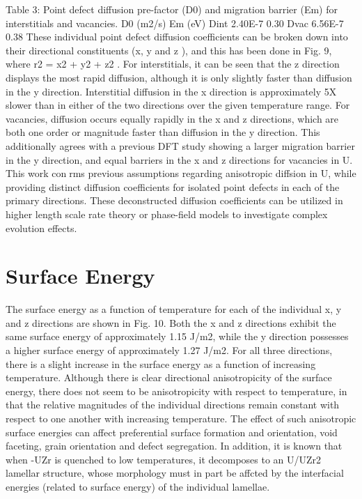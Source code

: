 \documentclass[review]{elsarticle}
\begin{document}
Table 3: Point defect diffusion pre-factor (D0) and migration barrier (Em) for interstitials and vacancies.
D0 (m2/s) Em (eV)
Dint 2.40E-7 0.30
Dvac 6.56E-7 0.38
These individual point defect diffusion coefficients can be broken down into their directional constituents
(x, y and z ), and this has been done in Fig. 9, where r2 = x2 + y2 + z2 . For interstitials, it can be seen
that the z direction displays the most rapid diffusion, although it is only slightly faster than diffusion in
the y direction. Interstitial diffusion in the x direction is approximately 5X slower than in either of the two
directions over the given temperature range. For vacancies, diffusion occurs equally rapidly in the x and z
directions, which are both one order or magnitude faster than diffusion in the y direction. This additionally
agrees with a previous DFT study showing a larger migration barrier in the y direction, and equal barriers in
the x and z directions for vacancies in U. This work conrms previous assumptions regarding anisotropic
diffsion in U, while providing distinct diffusion coefficients for isolated point defects in each of the primary
directions. These deconstructed diffusion coefficients can be utilized in higher length scale rate theory or phase-field models to investigate complex evolution effects.


\section{Surface Energy}

The surface energy as a function of temperature for each of the individual x, y and z directions are shown in Fig. 10. Both the x and z directions exhibit the same surface energy of approximately 1.15 J/m2, while the y direction possesses a higher surface energy of approximately 1.27 J/m2. For all three directions, there is a slight increase in the surface energy as a function of increasing temperature. Although there is clear directional anisotropicity of the surface energy, there does not seem to be anisotropicity with respect to temperature, in that the relative magnitudes of the individual directions remain constant with respect to one another with increasing temperature. The effect of such anisotropic surface energies can affect preferential surface formation and orientation, void faceting, grain orientation and defect segregation. In addition, it is known that when -UZr is quenched to low temperatures, it decomposes to an U/UZr2 lamellar structure, whose morphology must in part be affcted by the interfacial energies (related to surface
energy) of the individual lamellae.
\end{document}
